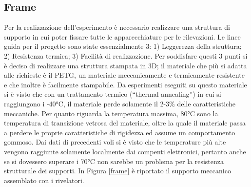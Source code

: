 \subsection*{Frame}

Per la realizzazione dell’esperimento è necessario realizzare una struttura di supporto in cui poter fissare tutte le apparecchiature per le rilevazioni. Le linee guida per il progetto sono state essenzialmente 3: 1) Leggerezza della struttura; 2) Resistenza termica; 3) Facilità di realizzazione. Per soddisfare questi 3 punti si è deciso di realizzare una struttura stampata in 3D; il materiale che più si adatta alle richieste è il PETG, un materiale meccanicamente e termicamente resistente e che inoltre è facilmente stampabile. Da esperimenti eseguiti su questo materiale si è visto che con un trattamento termico (“thermal annealing”) in cui si raggiungono i -40°C, il materiale perde solamente il 2-3\% delle caratteristiche meccaniche. Per quanto riguarda la temperatura massima, 80°C sono la temperatura di transizione vetrosa del materiale, oltre la quale il materiale passa a perdere le proprie caratteristiche di rigidezza ed assume un comportamento gommoso. Dai dati di precedenti voli si è visto che le temperature più alte vengono raggiunte solamente localmente dai compenti elettronici, pertanto anche se si dovessero superare i 70°C non sarebbe un problema per la resistenza strutturale dei supporti. In Figura \ref{frame} è riportato il supporto meccanico assemblato con i rivelatori.

